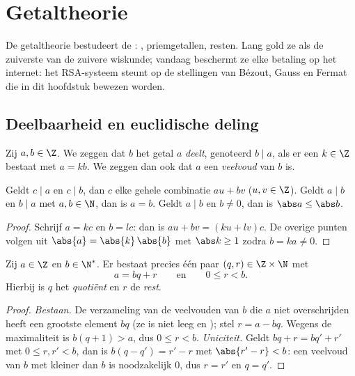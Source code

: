 \chapter{Getaltheorie}\label{ch:g12:arith}

De getaltheorie bestudeert de : , priemgetallen,
resten. Lang gold ze als de zuiverste van de zuivere wiskunde; vandaag
beschermt ze elke betaling op het internet: het RSA-systeem steunt op de
stellingen van Bézout, Gauss en Fermat die in dit hoofdstuk bewezen worden.

\section{Deelbaarheid en euclidische deling}

\begin{definition}[Deelbaarheid]\label{def:g12:arith:divides}
Zij $a, b \in \Z$. We zeggen dat $b$ het getal $a$ \emph{deelt},
genoteerd $b \mid a$, als er een $k \in \Z$ bestaat met $a = kb$. We zeggen
dan ook dat $a$ een \emph{veelvoud} van $b$ is.
\end{definition}

\begin{proposition}\label{prop:g12:arith:divprops}
Geldt $c \mid a$ en $c \mid b$, dan  $c$ elke gehele combinatie
$au + bv$ ($u, v \in \Z$). Geldt $a \mid b$ en $b \mid a$ met
$a,b \in \N$, dan is $a = b$. Geldt $a \mid b$ en $b \neq 0$, dan is
$\abs a \leq \abs b$.
\end{proposition}

\begin{proof}
Schrijf $a = kc$ en $b = lc$: dan is $au + bv = (ku + lv)c$. De overige punten
volgen uit $\abs{a} = \abs{k}\,\abs{b}$ met $\abs k \geq 1$ zodra
$b = ka \neq 0$.
\end{proof}

\begin{theorem}\label{thm:g12:arith:euclid}
Zij $a \in \Z$ en $b \in \N^*$. Er bestaat precies één paar
$(q, r) \in \Z \times \N$ met
\[
a = bq + r \qquad\text{en}\qquad 0 \leq r < b .
\]
Hierbij is $q$ het \emph{quotiënt} en $r$ de \emph{rest}.
\end{theorem}

\begin{proof}
\emph{Bestaan.} De verzameling van de veelvouden van $b$ die $a$ niet
overschrijden heeft een grootste element $bq$ (ze is niet leeg en ); stel $r = a - bq$. Wegens de maximaliteit is $b(q+1) > a$, dus
$0 \leq r < b$.
\emph{Uniciteit.} Geldt $bq + r = bq' + r'$ met $0 \leq r, r' < b$, dan is
$b(q - q') = r' - r$ met $\abs{r' - r} < b$: een veelvoud van $b$ met  kleiner dan $b$ is noodzakelijk $0$, dus $r = r'$ en $q = q'$.
\end{proof}

